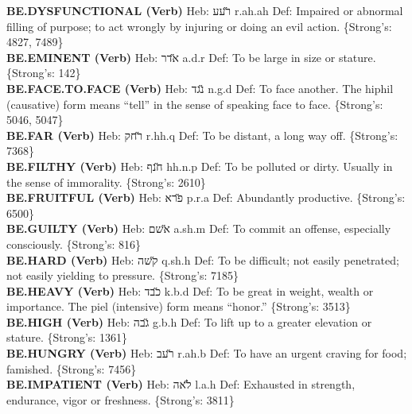 {\textbf{BE.DYSFUNCTIONAL (Verb)} Heb: {\large\H רעע} r.ah.ah Def: Impaired or abnormal filling of purpose; to act wrongly by injuring or doing an evil action. \{Strong's: 4827, 7489\}\hfill{}\\

\textbf{BE.EMINENT (Verb)} Heb: {\large\H אדר} a.d.r Def: To be large in size or stature. \{Strong's: 142\}\hfill{}\\

\textbf{BE.FACE.TO.FACE (Verb)} Heb: {\large\H נגד} n.g.d Def: To face another. The hiphil (causative) form means ``tell'' in the sense of speaking face to face. \{Strong's: 5046, 5047\}\hfill{}\\

\textbf{BE.FAR (Verb)} Heb: {\large\H רחק} r.hh.q Def: To be distant, a long way off. \{Strong's: 7368\}\hfill{}\\

\textbf{BE.FILTHY (Verb)} Heb: {\large\H חנף} hh.n.p Def: To be polluted or dirty. Usually in the sense of immorality. \{Strong's: 2610\}\hfill{}\\

\textbf{BE.FRUITFUL (Verb)} Heb: {\large\H פרא} p.r.a Def: Abundantly productive. \{Strong's: 6500\}\hfill{}\\

\textbf{BE.GUILTY (Verb)} Heb: {\large\H אשם} a.sh.m Def: To commit an offense, especially consciously. \{Strong's: 816\}\hfill{}\\

\textbf{BE.HARD (Verb)} Heb: {\large\H קשה} q.sh.h Def: To be difficult; not easily penetrated; not easily yielding to pressure. \{Strong's: 7185\}\hfill{}\\

\textbf{BE.HEAVY (Verb)} Heb: {\large\H כבד} k.b.d Def: To be great in weight, wealth or importance. The piel (intensive) form means ``honor.'' \{Strong's: 3513\}\hfill{}\\

\textbf{BE.HIGH (Verb)} Heb: {\large\H גבה} g.b.h Def: To lift up to a greater elevation or stature. \{Strong's: 1361\}\hfill{}\\

\textbf{BE.HUNGRY (Verb)} Heb: {\large\H רעב} r.ah.b Def: To have an urgent craving for food; famished. \{Strong's: 7456\}\hfill{}\\

\textbf{BE.IMPATIENT (Verb)} Heb: {\large\H לאה} l.a.h Def: Exhausted in strength, endurance, vigor or freshness. \{Strong's: 3811\}\hfill{}\\

}
